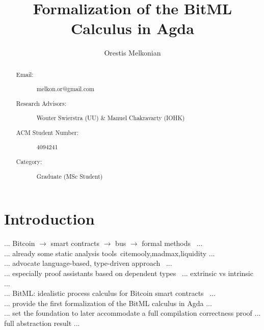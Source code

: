 \documentclass[acmsmall,nonacm=true,screen=true]{acmart}
\begin{document}
\sloppy %

\title{Formalization of the BitML Calculus in Agda}

\author{Orestis Melkonian}

\begin{abstract}
  \begin{description}
    \item[Email:] melkon.or@gmail.com
    \item[Research Advisors:] Wouter Swierstra (UU) \& Manuel Chakravarty (IOHK)
    \item[ACM Student Number:] 4094241
    \item[Category:] Graduate (MSc Student)
  \end{description}
\end{abstract}

\maketitle

\section{Introduction}
... Bitcoin $\rightarrow$ smart contracts $\rightarrow$ bus $\rightarrow$ formal methods~\cite{opportunities} ...\\
... already some static analysis tools~cite{mooly,madmax,liquidity} ...\\
... advocate language-based, type-driven approach~\cite{langverif} ...\\
... especially proof assistants based on dependent types~\cite{agda} ... extrinsic vs intrinsic ...\\

... BitML: idealistic process calculus for Bitcoin smart contracts~\cite{bitml} ...\\
... provide the first formalization of the BitML calculus in Agda ...\\
... set the foundation to later accommodate a full compilation correctness proof ... full abstraction result ...\\
\end{document}
